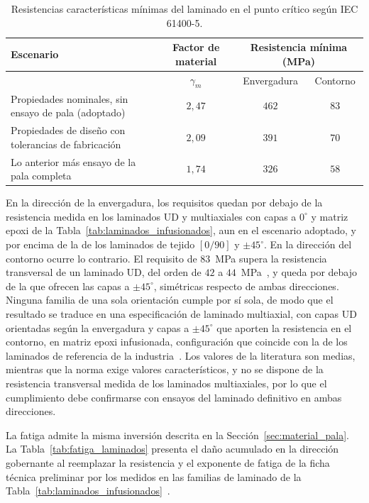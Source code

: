 \begin{table}[H]
    \centering
    \caption{Resistencias características mínimas del laminado en el punto crítico según IEC 61400-5.}
    \label{tab:propiedades_minimas}
    \begin{tabular}{>{\raggedright\arraybackslash}p{6.4cm}ccc}
        \hline
        \textbf{Escenario} & \textbf{Factor de material} & \multicolumn{2}{c}{\textbf{Resistencia mínima (MPa)}} \\
        \cline{3-4}
        & $\gamma_m$ & Envergadura & Contorno \\
        \hline
        Propiedades nominales, sin ensayo de pala (adoptado) & $2{,}47$ & $462$ & $83$\\
        Propiedades de diseño con tolerancias de fabricación & $2{,}09$ & $391$ & $70$\\
        Lo anterior más ensayo de la pala completa & $1{,}74$ & $326$ & $58$\\
        \hline
    \end{tabular}
\end{table}

En la dirección de la envergadura, los requisitos quedan por debajo de la resistencia medida en los laminados UD y multiaxiales con capas a $0^\circ$ y matriz epoxi de la Tabla~\ref{tab:laminados_infusionados}, aun en el escenario adoptado, y por encima de la de los laminados de tejido $[0/90]$ y $\pm 45^\circ$. En la dirección del contorno ocurre lo contrario. El requisito de $83$~MPa supera la resistencia transversal de un laminado UD, del orden de $42$ a $44$~MPa~\parencite{Samborsky2012,Arwood2023}, y queda por debajo de la que ofrecen las capas a $\pm 45^\circ$, simétricas respecto de ambas direcciones. Ninguna familia de una sola orientación cumple por sí sola, de modo que el resultado se traduce en una especificación de laminado multiaxial, con capas UD orientadas según la envergadura y capas a $\pm 45^\circ$ que aporten la resistencia en el contorno, en matriz epoxi infusionada, configuración que coincide con la de los laminados de referencia de la industria~\parencite{Nijssen2006,Samborsky2010}. Los valores de la literatura son medias, mientras que la norma exige valores característicos, y no se dispone de la resistencia transversal medida de los laminados multiaxiales, por lo que el cumplimiento debe confirmarse con ensayos del laminado definitivo en ambas direcciones.

La fatiga admite la misma inversión descrita en la Sección~\ref{sec:material_pala}. La Tabla~\ref{tab:fatiga_laminados} presenta el daño acumulado en la dirección gobernante al reemplazar la resistencia y el exponente de fatiga de la ficha técnica preliminar por los medidos en las familias de laminado de la Tabla~\ref{tab:laminados_infusionados}~\parencite{Samborsky2012}.


